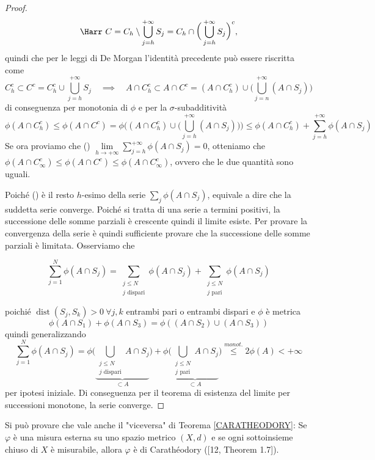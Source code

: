 \begin{proof}
  \[\Harr\ C=C_h\setminus \bigcup_{j=h}^{+\infty}S_j=C_h\cap \bigg( \bigcup_{j=h}^{+\infty} S_j \bigg)^c,\]
  quindi che per le leggi di De Morgan l'identità precedente può essere riscritta come 
  \[C_h^c\subset C^c=C^c_h\cup \bigcup_{j=h}^{+\infty}S_j\quad \implies \quad A\cap C_h^c\subset A\cap C^c=(A\cap C_h^c) \cup \bigg(\bigcup_{j=n}^{+\infty}(A\cap S_j)\bigg)\]
  di conseguenza per monotonia di $\phi$ e per la $\sigma$-subadditività
  \[\phi(A\cap C_h^c)\leq \phi(A\cap C^c) = \phi\bigg((A\cap C^c_h)\cup \bigg(\bigcup_{j=h}^{+\infty}(A\cap S_j)\bigg)\bigg)\leq \phi(A\cap C^c_h)+\sum _{j=h}^{+\infty} \phi(A\cap S_j)\]
  Se ora proviamo che (\textbullet) $\lim\limits_{h\to +\infty}\sum_{j=h}^{+\infty}\phi(A\cap S_j)=0$, otteniamo che $\phi(A\cap C^c_\infty)\leq \phi(A\cap C^c)\leq \phi(A\cap C_\infty^c)$, ovvero che le due quantità sono uguali.

  Poiché (\textbullet) è il resto $h$-esimo della serie $\sum_j\phi(A\cap S_j)$, equivale a dire che la suddetta serie converge. Poiché si tratta di una serie a termini positivi, la successione delle somme parziali è crescente quindi il limite esiste. Per provare la convergenza della serie è quindi sufficiente provare che la successione delle somme parziali è limitata. Osserviamo che

  \[\sum_{j=1}^N\phi(A\cap S_j)=\sum_{\substack{j\leq N\\j \text{ dispari}}}\phi(A\cap S_j)+\sum_{\substack{j\leq N\\j \text{ pari}}}\phi(A\cap S_j)\]

  poichié $\operatorname{dist}(S_j, S_k)>0\ \forall j,k $ entrambi pari o entrambi dispari e $\phi$ è metrica 
  \[\phi(A\cap S_1)+\phi(A\cap S_3)=\phi((A\cap S_2)\cup (A\cap S_3))\]
  quindi generalizzando
  \[\sum_{j=1}^N\phi(A\cap S_j)=\phi\bigg(\underbrace{\!\!\!\!\bigcup_{\substack{j\leq N\\j \text{ dispari}}}\!\!\!A\cap S_j}_{\subset A}\bigg)+\phi\bigg(\underbrace{\!\!\bigcup_{\substack{j\leq N\\j \text{ pari}}}\!\!\!A\cap S_j}_{\subset A}\bigg)\overset{monot.}{\leq} 2\phi(A)<+\infty\]
  per ipotesi iniziale. Di conseguenza per il teorema di esistenza del limite per successioni monotone, la serie converge. 
\end{proof}
\begin{remark}
  Si può provare che vale anche il "viceversa" di Teorema \ref{CARATHEODORY}: Se $\varphi$ è una misura esterna su uno spazio metrico $(X, d)$ e se ogni sottoinsieme chiuso di $X$ è misurabile, allora $\varphi$ è di Carathéodory ([12, Theorem 1.7]).
\end{remark}

